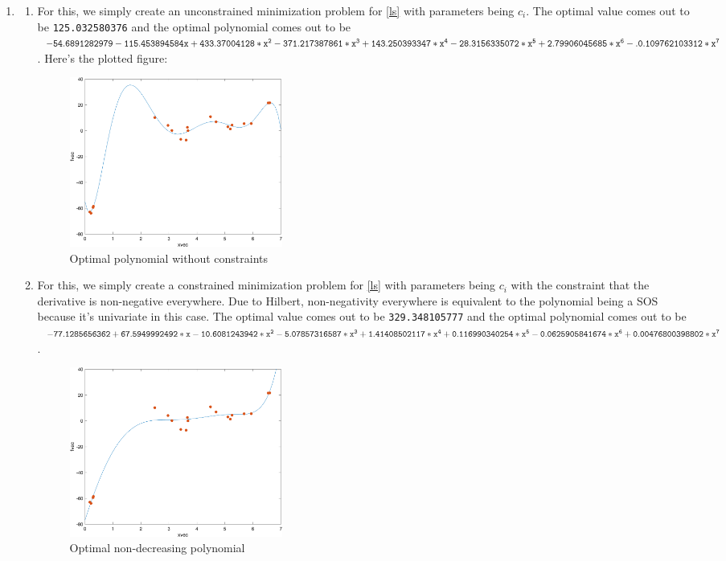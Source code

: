 \soln
\begin{enumerate}[leftmargin=*]
\item 
\begin{enumerate}[label=(\alph*)]
\item For this, we simply create an unconstrained minimization problem for \ref{ls} with parameters being $c_{i}$. 
The optimal value comes out to be \texttt{125.032580376} and the optimal polynomial comes out to be $\tt -54.6891282979 - 115.453894584x + 433.37004128*x^2 - 371.217387861*x^3 + 143.250393347*x^4 - 28.3156335072*x^5 + 2.79906045685*x^6 - .0.109762103312*x^7$. Here's the plotted figure:

\begin{figure}[htbp]
\centerline{\includegraphics[width=7cm]{leastsquare.png}}
\caption{Optimal polynomial without constraints}
\end{figure}

\begin{minipage}[c]{0.9\textwidth}

\end{minipage}

\item For this, we simply create a constrained minimization problem for \ref{ls} with parameters being $c_{i}$ with the constraint that the derivative is non-negative everywhere. Due to Hilbert, non-negativity everywhere is equivalent to the polynomial being a SOS because it's univariate in this case. 
The optimal value comes out to be \texttt{329.348105777} and the optimal polynomial comes out to be $\tt -77.1285656362 + 67.5949992492*x - 10.6081243942*x^2 - 5.07857316587*x^3 + 1.41408502117*x^4 + 0.116990340254*x^5 - 0.0625905841674*x^6 + 0.00476800398802*x^7$. 

\begin{figure}
\centerline{\includegraphics[width=7cm]{leastsquareinc.png}}
\caption{Optimal non-decreasing polynomial}
\end{figure}


\end{enumerate}
\end{enumerate}
